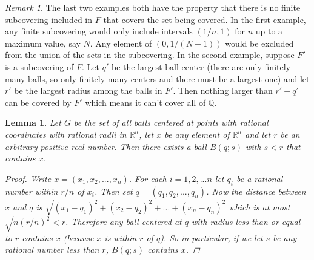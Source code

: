 \documentclass[11pt,a4paper]{report}
\theoremstyle{plain}
\newtheorem{lem}[thm]{Lemma}
\theoremstyle{definition}
\theoremstyle{remark}
\newtheorem*{rem}{Remark}
\begin{document}
\begin{rem}
The last two examples both have the property that there is no finite subcovering included in $F$ that covers the set being covered.  In the first example, any finite subcovering would only include intervals $(1/n,1)$ for $n$ up to a maximum value, say $N$.  Any element of $(0, 1/(N + 1))$ would be excluded from the union of the sets in the subcovering.  In the second example, suppose $F'$ is a subcovering of $F$.  Let $q'$ be the largest ball center (there are only finitely many balls, so only finitely many centers and there must be a largest one) and let $r'$ be the largest radius among the balls in $F'$.  Then nothing larger than $r' + q'$ can be covered by $F'$ which means it can't cover all of $\mathbb{Q}$.
\end{rem}

\begin{lem}
Let $G$ be the set of all balls centered at points with rational coordinates with rational radii in $\mathbb{R}^n$, let $x$ be any element of $\mathbb{R}^n$ and let $r$ be an arbitrary positive real number.  Then there exists a ball $B(q; s)$ with $s < r$ that contains $x$.
\begin{proof}
Write $x = (x_1, x_2, ... , x_n)$.  For each $i = 1,2, ... n$ let $q_i$ be a rational number within $r/n$ of $x_i$.  Then set $q = (q_1, q_2, ... , q_n)$.  Now the distance between $x$ and $q$ is $\sqrt{(x_1 - q_1)^2 + (x_2 - q_2)^2 + ... + (x_n - q_n)^2}$ which is at most $\sqrt{n (r/n)^2} < r$.  Therefore any ball centered at $q$ with radius less than or equal to $r$ contains $x$ (because $x$ is within $r$ of $q$).  So in particular, if we let $s$ be any rational number less than $r$, $B(q;s)$ contains $x$.
\end{proof}
\end{lem}
\end{document}
